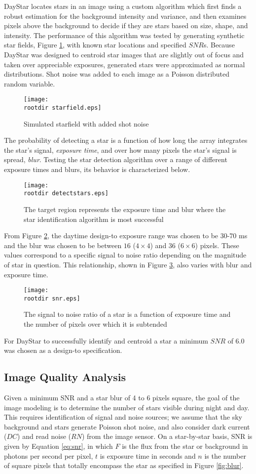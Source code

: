 \documentclass[twocolumn,letterpaper]{IEEEAerospace2012}
\newcommand{\rootdir}{./Figures/}
\newcommand{\RN}{\mathit{RN}}
\newcommand{\DC}{\mathit{DC}}
\begin{document}
DayStar locates stars in an image using a custom algorithm which first finds a robust estimation for the background intensity and variance, and then examines pixels above the background to decide if they are stars based on size, shape, and intensity. The performance of this algorithm was tested by generating synthetic star fields, Figure \ref{fig:starfield}, with known star locations and specified $SNR$s. Because DayStar was designed to centroid star images that are slightly out of focus and taken over appreciable exposures, generated stars were approximated as normal distributions. Shot noise was added to each image as a Poisson distributed random variable.
\begin{figure}[H]
    \label{fig:starfield}
    \texttt{[image: \\rootdir starfield.eps]}
    \caption{Simulated starfield with added shot noise}
\end{figure}
The probability of detecting a star is a function of how long the array integrates the star's signal, \textit{exposure time}, and over how many pixels the star's signal is spread, \textit{blur}. Testing the star detection algorithm over a range of different exposure times and blurs, its behavior is characterized below.
\begin{figure}[H]
    \label{fig:detectstars}
    \texttt{[image: \\rootdir detectstars.eps]}
    \caption{The target region represents the exposure time and blur where the star identification algorithm is most successful}
\end{figure}
From Figure \ref{fig:detectstars}, the daytime design-to exposure range was chosen to be 30-70 ms and the blur was chosen to be between $16$ ($4 \times 4$) and $36$ ($6 \times 6$) pixels. These values correspond to a specific signal to noise ratio depending on the magnitude of star in question. This relationship, shown in Figure \ref{fig:snr}, also varies with blur and exposure time.
\begin{figure}[H]
    \label{fig:snr}
    \texttt{[image: \\rootdir snr.eps]}
    \caption{The signal to noise ratio of a star is a function of exposure time and the number of pixels over which it is subtended}
\end{figure}

For DayStar to successfully identify and centroid a star a minimum $SNR$ of 6.0 was chosen as a design-to specification.

\subsection{Image Quality Analysis}
Given a minimum SNR and a star blur of 4 to 6 pixels square, the goal of the image modeling is to determine the number of stars visible during night and day. This requires identification of signal and noise sources; we assume that the sky background and stars generate Poisson shot noise, and also consider dark current ($\DC$) and read noise ($\RN$) from the image sensor. On a star-by-star basis, SNR is given by Equation \ref{eq:snr}, in which $F$ is the flux from the star or background in photons per second per pixel, $t$ is exposure time in seconds and $n$ is the number of square pixels that totally encompass the star as specified in Figure \ref{fig:blur}.
\end{document}
